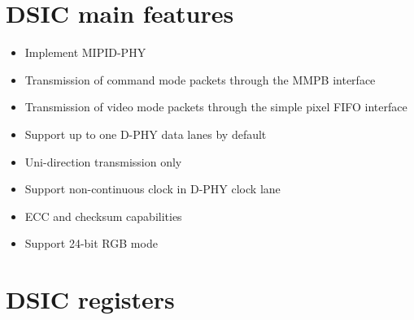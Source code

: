 \documentclass[a4paper, draft, oneside]{memoir}
\begin{document}
\section{DSIC main features}

\begin{itemize}
  \item Implement MIPI\textregistered D-PHY
  \item Transmission of command mode packets through the MMPB interface
  \item Transmission of video mode packets through the simple pixel FIFO interface
  \item Support up to one D-PHY data lanes by default
  \item Uni-direction transmission only
  \item Support non-continuous clock in D-PHY clock lane
  \item ECC and checksum capabilities
  \item Support 24-bit RGB mode
\end{itemize}

\section{DSIC registers}
\end{document}
